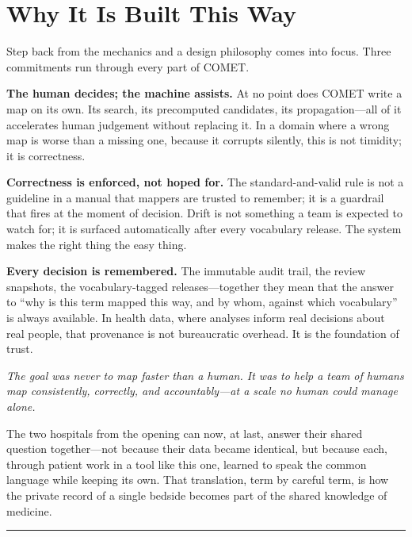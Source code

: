 \documentclass[12pt,openany]{book}
\newcommand{\pullquote}[1]{%
  \begin{center}\smallskip
  {\sffamily\itshape\large\color{cometbrown} #1}\smallskip\end{center}}
\begin{document}
\clearpage
\section{Why It Is Built This Way}

Step back from the mechanics and a design philosophy comes into focus. Three commitments run through
every part of COMET.

\textbf{The human decides; the machine assists.} At no point does COMET write a map on its own. Its
search, its precomputed candidates, its propagation---all of it accelerates human judgement without
replacing it. In a domain where a wrong map is worse than a missing one, because it corrupts silently,
this is not timidity; it is correctness.

\textbf{Correctness is enforced, not hoped for.} The standard-and-valid rule is not a guideline in a
manual that mappers are trusted to remember; it is a guardrail that fires at the moment of decision.
Drift is not something a team is expected to watch for; it is surfaced automatically after every
vocabulary release. The system makes the right thing the easy thing.

\textbf{Every decision is remembered.} The immutable audit trail, the review snapshots, the
vocabulary-tagged releases---together they mean that the answer to ``why is this term mapped this way,
and by whom, against which vocabulary'' is always available. In health data, where analyses inform
real decisions about real people, that provenance is not bureaucratic overhead. It is the foundation
of trust.

\pullquote{The goal was never to map faster than a human. It was to help a team of humans map
\emph{consistently}, \emph{correctly}, and \emph{accountably}---at a scale no human could manage
alone.}

The two hospitals from the opening can now, at last, answer their shared question together---not
because their data became identical, but because each, through patient work in a tool like this one,
learned to speak the common language while keeping its own. That translation, term by careful term, is
how the private record of a single bedside becomes part of the shared knowledge of medicine.

\vspace{1.2em}
{\color{cometrule}\rule{\linewidth}{0.8pt}}
\vspace{2pt}
\end{document}
